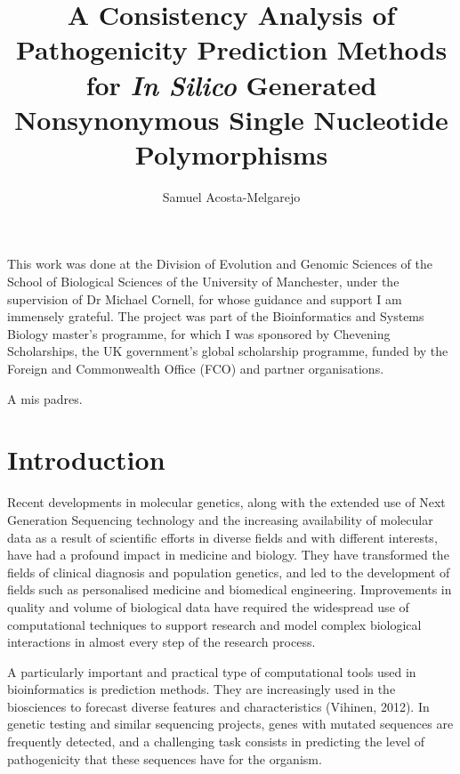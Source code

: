 \documentclass[12pt,MSc,wordcount,anon]{muthesis}
\begin{document}
\title{A Consistency Analysis of Pathogenicity Prediction Methods for \textit{In Silico} Generated Nonsynonymous Single Nucleotide Polymorphisms}
\author{Samuel Acosta-Melgarejo}
\department{}

\begin{flushleft}

\beforeabstract
{}

\afterabstract

This work was done at the Division of Evolution and Genomic Sciences of the School of Biological Sciences of the University of Manchester, under the supervision of Dr Michael Cornell, for whose guidance and support I am immensely grateful. The project was part of the Bioinformatics and Systems Biology master's programme, for which I was sponsored by Chevening Scholarships, the UK government's global scholarship programme, funded by the Foreign and Commonwealth Office (FCO) and partner organisations.
\afterpreface

\clearpage
\begin{flushright}
    \thispagestyle{empty}
    \vspace*{\fill}
    A mis padres.
    \vspace*{\fill}
\end{flushright}
\clearpage

\chapter{Introduction}
\label{cha:intro}

Recent developments in molecular genetics, along with the extended use of Next Generation Sequencing technology and the increasing availability of molecular data as a result of scientific efforts in diverse fields and with different interests, have had a profound impact in medicine and biology. They have transformed the fields of clinical diagnosis and population genetics, and led to the development of fields such as personalised medicine and biomedical engineering. Improvements in quality and volume of biological data have required the widespread use of computational techniques to support research and model complex biological interactions in almost every step of the research process.

A particularly important and practical type of computational tools used in bioinformatics is prediction methods. They are increasingly used in the biosciences to forecast diverse features and characteristics (Vihinen, 2012). In genetic testing and similar sequencing projects, genes with mutated sequences are frequently detected, and a challenging task consists in predicting the level of pathogenicity that these sequences have for the organism.


\end{flushleft}
\end{document}

